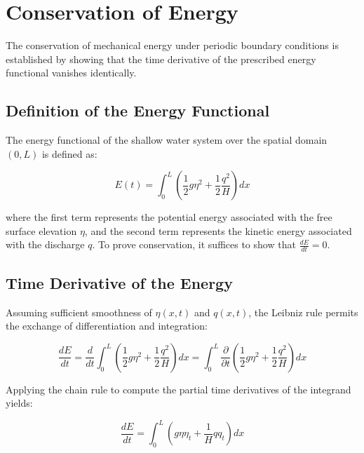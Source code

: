 
\section{Conservation of Energy}
\label{sc:22}

The conservation of mechanical energy under periodic boundary conditions is established by showing that the time derivative of the prescribed energy functional vanishes identically.

\subsection{Definition of the Energy Functional}

The energy functional of the shallow water system over the spatial domain \((0,L)\) is defined as:

\begin{equation}
E(t) = \int_{0}^{L} \left( \frac{1}{2}g\eta^{2} + \frac{1}{2}\frac{q^{2}}{H} \right) dx
\label{eq:energy}
\end{equation}

where the first term represents the potential energy associated with the free surface elevation \(\eta\), and the second term represents the kinetic energy associated with the discharge \(q\). To prove conservation, it suffices to show that \(\frac{dE}{dt} = 0\).

\subsection{Time Derivative of the Energy}

Assuming sufficient smoothness of \(\eta(x,t)\) and \(q(x,t)\), the Leibniz rule permits the exchange of differentiation and integration:

\begin{equation}
\frac{dE}{dt} = \frac{d}{dt} \int_{0}^{L} \left( \frac{1}{2}g\eta^{2} + \frac{1}{2}\frac{q^{2}}{H} \right) dx = \int_{0}^{L} \frac{\partial}{\partial t} \left( \frac{1}{2}g\eta^{2} + \frac{1}{2}\frac{q^{2}}{H} \right) dx
\end{equation}

Applying the chain rule to compute the partial time derivatives of the integrand yields:

\begin{equation}
\frac{dE}{dt} = \int_{0}^{L} \left( g \eta \eta_t + \frac{1}{H} q q_t \right) dx
\label{eq:energy_dt}
\end{equation}


